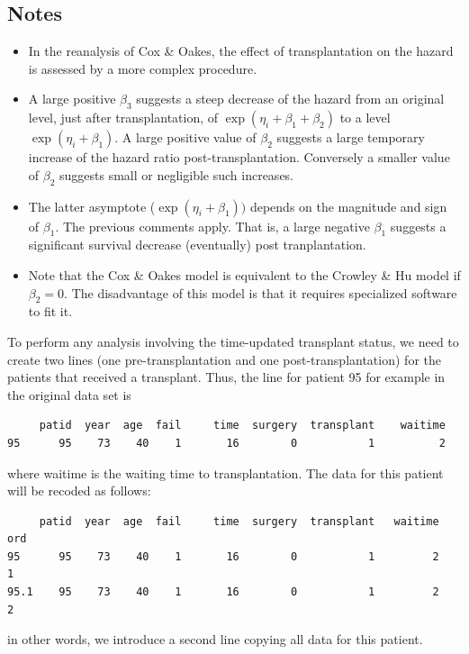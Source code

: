 \documentclass[10pt]{book}
\begin{document}
\subsection{Notes}
\begin{itemize}
\item
In the reanalysis of Cox \& Oakes, the effect of transplantation on the hazard is assessed by a more complex procedure.
\item A large positive $\beta_3$ suggests a steep decrease of the hazard from an original level, just after transplantation, of $\exp(\eta_i+\beta_1+\beta_2)$ to a level $\exp(\eta_i+\beta_1)$.  A large positive value of $\beta_2$ suggests a large temporary increase of the hazard ratio post-transplantation.  Conversely a smaller value of $\beta_2$ suggests small or negligible such increases.
\item
The latter asymptote ($\exp(\eta_i+\beta_1))$ depends on the magnitude and sign of $\beta_1$.  The previous comments apply. That is, a large negative $\beta_1$ suggests a significant survival decrease (eventually) post tranplantation. \item
Note that the Cox \& Oakes model is equivalent to the Crowley \& Hu model if $\beta_2=0$.  The disadvantage of this model is that it requires specialized software to fit it.
\end{itemize}
\normalsize
To perform any analysis involving the time-updated transplant status, we need to create two lines (one pre-transplantation and one post-transplantation) for the patients that received a transplant.  Thus, the line for patient 95 for example in the original data set is

\small
\begin{verbatim}
     patid  year  age  fail     time  surgery  transplant    waitime   
95      95    73    40    1       16        0           1          2 
\end{verbatim}
\normalsize
where \textsf{waitime} is the waiting time to transplantation.  The data for this patient will be recoded as follows:
\small
\begin{verbatim}
     patid  year  age  fail     time  surgery  transplant   waitime   ord
95      95    73    40    1       16        0           1         2     1
95.1    95    73    40    1       16        0           1         2     2
\end{verbatim}
\normalsize
in other words, we introduce a second line copying all data for this patient.
\end{document}
